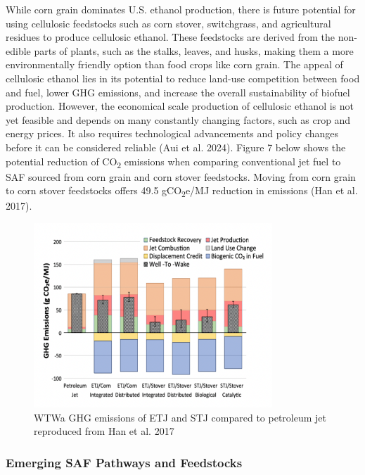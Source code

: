 \documentclass[12pt]{article}
\begin{document}
 While corn grain dominates U.S. ethanol production, there is future potential for using cellulosic feedstocks such as corn stover, switchgrass, and agricultural residues to produce cellulosic ethanol. These feedstocks are derived from the non-edible parts of plants, such as the stalks, leaves, and husks, making them a more environmentally friendly option than food crops like corn grain. The appeal of cellulosic ethanol lies in its potential to reduce land-use competition between food and fuel, lower GHG emissions, and increase the overall sustainability of biofuel production. However, the economical scale production of cellulosic ethanol is not yet feasible and depends on many constantly changing factors, such as crop and energy prices. It also requires technological advancements and policy changes before it can be considered reliable (Aui et al. 2024). Figure 7 below shows the potential reduction of CO\textsubscript{2} emissions when comparing conventional jet fuel to SAF sourced from corn grain and corn stover feedstocks. Moving from corn grain to corn stover feedstocks offers 49.5 gCO\textsubscript{2}e/MJ reduction in emissions (Han et al. 2017). 

\begin{figure}[H]
\centering
\includegraphics[width=0.8\textwidth]{Fig 7.png} %
\caption{WTWa GHG emissions of ETJ and STJ compared to petroleum jet reproduced from Han et al. 2017}
\label{fig:figure 7}
\end{figure}
 

\subsubsection{ Emerging SAF Pathways and Feedstocks}
\end{document}
